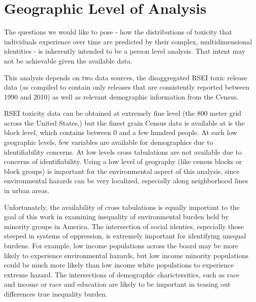\documentclass[12pt,twoside]{dukestatscithesis}
\theoremstyle{definition}
\theoremstyle{definition}
\theoremstyle{definition}
\theoremstyle{remark}
\begin{document}
\section{Geographic Level of
Analysis}\label{geographic-level-of-analysis}

The questions we would like to pose - how the distributions of toxicity
that individuals experience over time are predicted by their complex,
multidimensional identities - is inherently intended to be a person
level analysis. That intent may not be achievable given the available
data.

This analysis depends on two data sources, the disaggregated RSEI toxic
release data (as compiled to contain only releases that are consistently
reported between 1990 and 2010) as well as relevant demographic
information from the Census.

RSEI toxicity data can be obtained at extremely fine level (the 800
meter grid across the United States,) but the finest grain Census data
is available at is the block level, which contains between 0 and a few
hundred people. At such low geographic levels, few variables are
available for demographics due to identifiability concerns. At low
levels cross tabulations are not available due to concerns of
identifiability. Using a low level of geography (like census blocks or
block groups) is important for the environmental aspect of this
analysis, since environmental hazards can be very localized, especially
along neighborhood lines in urban areas.

Unfortunately, the availability of cross tabulations is equally
important to the goal of this work in examining inequality of
environmental burden held by minority groups in America. The
intersection of social identies, especially those steeped in systems of
oppression, is extremely important for identifying unequal burdens. For
example, low income populations across the board may be more likely to
experience environmental hazards, but low income minority populations
could be much more likely than low income white populations to
experience extreme hazard. The intersections of demographic
charictersitics, such as race and income or race and education are
likely to be important in teasing out differences true inequality
burden.
\end{document}
